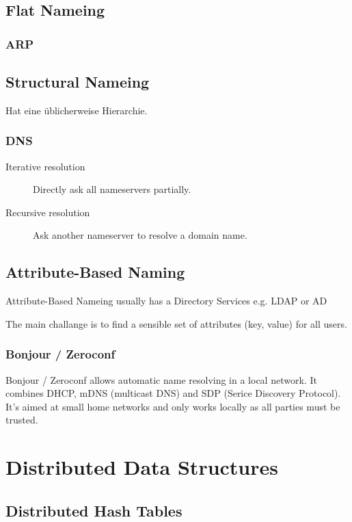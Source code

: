 \subsection{Flat Nameing}
\subsubsection{ARP}

\subsection{Structural Nameing}
Hat eine üblicherweise Hierarchie.

\subsubsection{DNS}

\begin{description}
	\item[Iterative resolution]	Directly ask all nameservers partially.
	\item[Recursive resolution]	Ask another nameserver to resolve a domain name.
\end{description}

\subsection{Attribute-Based Naming}

Attribute-Based Nameing usually has a Directory Services e.g. LDAP or AD

The main challange is to find a sensible set of attributes (key, value) for all users.

\subsubsection{Bonjour / Zeroconf}

Bonjour / Zeroconf allows automatic name resolving in a local network. It combines DHCP, mDNS (multicast DNS) and SDP (Serice Discovery Protocol). It's aimed at small home networks and only works locally as all parties must be trusted.


\section{Distributed Data Structures}
\subsection{Distributed Hash Tables}

